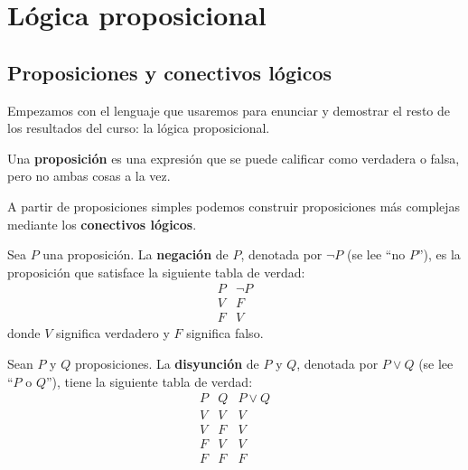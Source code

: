 \documentclass[12pt,a4paper]{book}
\begin{document}
    \setcounter{page}{1}
    \tableofcontents

    \chapter{Lógica proposicional}

    \section{Proposiciones y conectivos lógicos}

    Empezamos con el lenguaje que usaremos para enunciar y demostrar el resto de los resultados del curso: la lógica proposicional.

    \begin{definicion}[Proposición]
        Una \textbf{proposición} es una expresión que se puede calificar como verdadera o falsa, pero no ambas cosas a la vez.
    \end{definicion}

    A partir de proposiciones simples podemos construir proposiciones más complejas mediante los \textbf{conectivos lógicos}.

    \begin{definicion}[Negación]
        Sea $P$ una proposición. La \textbf{negación} de $P$, denotada por $\neg P$ (se lee ``no $P$''), es la proposición que satisface la siguiente tabla de verdad:
        \begin{equation*}
            \begin{array}{c|c}
                P & \neg P \\ \hline
                V & F      \\
                F & V
            \end{array}
        \end{equation*}
        donde $V$ significa verdadero y $F$ significa falso.
    \end{definicion}

    \begin{definicion}[Disyunción]
        Sean $P$ y $Q$ proposiciones. La \textbf{disyunción} de $P$ y $Q$, denotada por $P \vee Q$ (se lee ``$P$ o $Q$''), tiene la siguiente tabla de verdad:
        \begin{equation*}
            \begin{array}{cc|c}
                P & Q & P \vee Q \\ \hline
                V & V & V        \\
                V & F & V        \\
                F & V & V        \\
                F & F & F
            \end{array}
        \end{equation*}
    \end{definicion}
\end{document}
